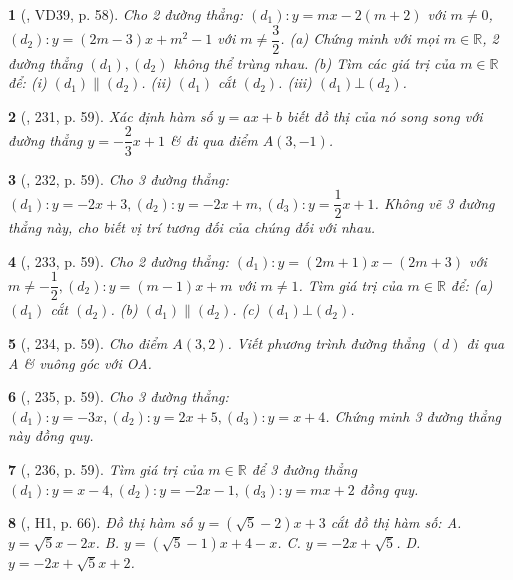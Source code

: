 \documentclass{article}
\newtheorem{baitoan}{}
\begin{document}
\begin{baitoan}[\cite{Tuyen_Toan_8}, VD39, p. 58]
	Cho 2 đường thẳng: $(d_1):y = mx - 2(m + 2)$ với $m\ne0$, $(d_2):y = (2m - 3)x + m^2 - 1$ với $m\ne\dfrac{3}{2}$. (a) Chứng minh với mọi $m\in\mathbb{R}$, 2 đường thẳng $(d_1),(d_2)$ không thể trùng nhau. (b) Tìm các giá trị của $m\in\mathbb{R}$ để: (i) $(d_1)\parallel(d_2)$. (ii) $(d_1)$ cắt $(d_2)$. (iii) $(d_1)\bot(d_2)$.
\end{baitoan}

\begin{baitoan}[\cite{Tuyen_Toan_8}, 231, p. 59]
	Xác định hàm số $y = ax + b$ biết đồ thị của nó song song với đường thẳng $y = -\dfrac{2}{3}x + 1$ \& đi qua điểm $A(3,-1)$.
\end{baitoan}

\begin{baitoan}[\cite{Tuyen_Toan_8}, 232, p. 59]
	Cho 3 đường thẳng: $(d_1):y = -2x + 3,(d_2):y = -2x + m,(d_3):y = \dfrac{1}{2}x + 1$. Không vẽ 3 đường thẳng này, cho biết vị trí tương đối của chúng đối với nhau.
\end{baitoan}

\begin{baitoan}[\cite{Tuyen_Toan_8}, 233, p. 59]
	Cho 2 đường thẳng: $(d_1):y = (2m + 1)x - (2m + 3)$ với $m\ne-\dfrac{1}{2},(d_2):y = (m - 1)x + m$ với $m\ne1$. Tìm giá trị của $m\in\mathbb{R}$ để: (a) $(d_1)$ cắt $(d_2)$. (b) $(d_1)\parallel(d_2)$. (c) $(d_1)\bot(d_2)$.
\end{baitoan}

\begin{baitoan}[\cite{Tuyen_Toan_8}, 234, p. 59]
	Cho điểm $A(3,2)$. Viết phương trình đường thẳng $(d)$ đi qua A \& vuông góc với OA.
\end{baitoan}

\begin{baitoan}[\cite{Tuyen_Toan_8}, 235, p. 59]
	Cho 3 đường thẳng: $(d_1):y = -3x,(d_2):y = 2x + 5,(d_3):y = x + 4$. Chứng minh 3 đường thẳng này đồng quy.
\end{baitoan}

\begin{baitoan}[\cite{Tuyen_Toan_8}, 236, p. 59]
	Tìm giá trị của $m\in\mathbb{R}$ để 3 đường thẳng $(d_1):y = x - 4,(d_2):y = -2x - 1,(d_3):y = mx + 2$ đồng quy.
\end{baitoan}

\begin{baitoan}[\cite{Binh_boi_duong_Toan_9_tap_1}, H1, p. 66]
	Đồ thị hàm số $y = (\sqrt{5} - 2)x + 3$ cắt đồ thị hàm số: {\sf A.} $y =  \sqrt{5}x - 2x$. {\sf B.} $y = (\sqrt{5} - 1)x + 4 - x$. {\sf C.} $y = -2x + \sqrt{5}$. {\sf D.} $y = -2x + \sqrt{5}x + 2$.
\end{baitoan}
\end{document}
